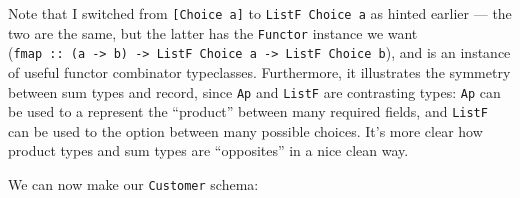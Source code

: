 \documentclass[]{article}
\newenvironment{Shaded}{}{}
\newcommand{\CommentTok}[1]{\textcolor[rgb]{0.38,0.63,0.69}{\textit{#1}}}
\newcommand{\DataTypeTok}[1]{\textcolor[rgb]{0.56,0.13,0.00}{#1}}
\newcommand{\NormalTok}[1]{#1}
\newcommand{\OperatorTok}[1]{\textcolor[rgb]{0.40,0.40,0.40}{#1}}
\newcommand{\OtherTok}[1]{\textcolor[rgb]{0.00,0.44,0.13}{#1}}
\newcommand{\StringTok}[1]{\textcolor[rgb]{0.25,0.44,0.63}{#1}}
\begin{document}
Note that I switched from \texttt{{[}Choice\ a{]}} to \texttt{ListF\ Choice\ a}
as hinted earlier --- the two are the same, but the latter has the
\texttt{Functor} instance we want
(\texttt{fmap\ ::\ (a\ -\textgreater{}\ b)\ -\textgreater{}\ ListF\ Choice\ a\ -\textgreater{}\ ListF\ Choice\ b}),
and is an instance of useful functor combinator typeclasses. Furthermore, it
illustrates the symmetry between sum types and record, since \texttt{Ap} and
\texttt{ListF} are contrasting types: \texttt{Ap} can be used to a represent the
``product'' between many required fields, and \texttt{ListF} can be used to the
option between many possible choices. It's more clear how product types and sum
types are ``opposites'' in a nice clean way.

We can now make our \texttt{Customer} schema:

\begin{Shaded}
\end{Shaded}
\end{document}

